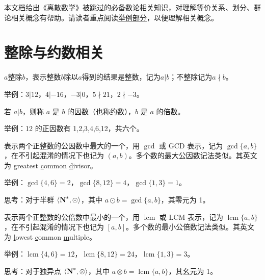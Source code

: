 \documentclass[UTF8]{ctexart}
\newcommand\Concept[1]{\colorbox{cyan!10!white}{\textcolor{cyan!40!black}{#1}}}
\newcommand\Notes[1]{\textcolor{yellow!50!black}{\small #1}}
\newcommand\Example[1]{\textcolor{cyan!70!black}{\small #1}}
\newcommand\relation[2]{\langle #1,#2 \rangle}
\newcommand\pos[1]{\hspace{0pt} \marginpar{\footnotesize\ttfamily\textcolor{yellow!50!black}{\hfill #1}}}
\newcommand\lcm{\operatorname{lcm}}
\newcommand\N{\text{\textbf{N}}}
\begin{document}
\begin{flushleft}
\color{cyan!50!black}
本文档给出《离散数学》被跳过的必备数论相关知识，对理解等价关系、划分、群论相关概念有帮助。请读者重点阅读\underline{举例部分}，以便理解相关概念。
\end{flushleft}


\section{整除与约数相关}
\begin{description}[itemsep=0pt, parsep=0pt]
    \item[\Concept{整除}] \pos{p185} $a$整除$b$，表示整数$b$除以$a$得到的结果是整数，记为$a|b$；不整除记为$a\nmid b$。

    \Example{举例：$3|12$，$4|-16$，$-3|0$，$5\nmid 21$，$2\nmid -3$。}

    \item[\Concept{因数与倍数}] \pos{p185} 若 $a|b$，则称 $a$ 是 $b$ 的因数（也称\Concept{约数}），$b$ 是 $a$ 的倍数。

    \Example{举例：12 的正因数有 1,2,3,4,6,12，共六个。}

    \item[\Concept{最大公因数}] \pos{p188} 表示两个正整数的公因数中最大的一个，用 $\gcd$ 或 $\mathrm{GCD}$ 表示，记为 $\gcd\{a,b\}$，在不引起混淆的情况下也记为 $(a,b)$。多个数的最大公因数记法类似。其英文为 \underline{g}reatest \underline{c}ommon \underline{d}ivisor。

    \Example{举例：$\gcd\{4,6\}=2$，$\gcd\{8,12\}=4$，$\gcd\{1,3\}=1$。}

    \Notes{思考：对于半群 $\relation{\N ^*}{\odot}$，其中 $a\odot b=\gcd\{a,b\}$，其零元为 1。}

    \item[\Concept{最小公倍数}] \pos{p190} 表示两个正整数的公倍数中最小的一个，用 $\lcm$ 或 $\mathrm{LCM}$ 表示，记为 $\lcm\{a,b\}$，在不引起混淆的情况下也记为 $[a,b]$。多个数的最小公倍数记法类似。其英文为 \underline{l}owest \underline{c}ommon \underline{m}ultiple。

    \Example{举例：$\lcm\{4,6\}=12$，$\lcm\{8,12\}=24$，$\lcm\{1,3\}=3$。}

    \Notes{思考：对于独异点 $\relation{\N ^*}{\otimes}$，其中 $a\otimes b=\lcm\{a,b\}$，其幺元为 1。}
\end{description}
\end{document}
